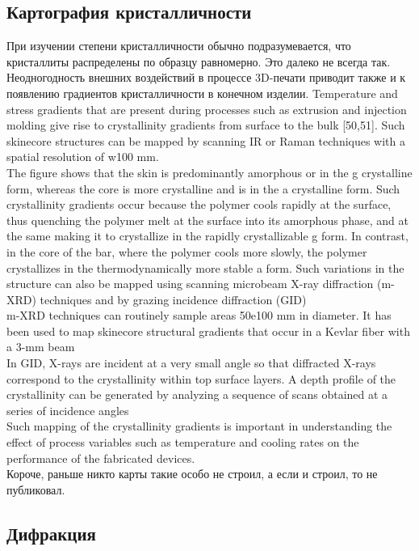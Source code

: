 \subsection{Картография кристалличности}
При изучении степени кристалличности обычно подразумевается, что кристаллиты распределены по образцу равномерно. Это далеко не всегда так. Неодногодность внешних воздействий в процессе 3D-печати приводит также и к появлению градиентов кристалличности в конечном изделии. 
 Temperature
and stress gradients that are present during processes such as extrusion and injection
molding give rise to crystallinity gradients from surface to the bulk [50,51]. Such
skinecore structures can be mapped by scanning IR or Raman techniques with a
spatial resolution of w100 mm.\\
The figure shows that the skin is predominantly amorphous or in the g crystalline
form, whereas the core is more crystalline and is in the a crystalline form. Such crystallinity
gradients occur because the polymer cools rapidly at the surface, thus quenching
the polymer melt at the surface into its amorphous phase, and at the same making it
to crystallize in the rapidly crystallizable g form. In contrast, in the core of the bar,
where the polymer cools more slowly, the polymer crystallizes in the thermodynamically
more stable a form. Such variations in the structure can also be mapped using
scanning microbeam X-ray diffraction (m-XRD) techniques and by grazing incidence
diffraction (GID)\\
m-XRD techniques can routinely sample areas 50e100 mm
in diameter. It has been used to map skinecore structural gradients that occur in a
Kevlar fiber with a 3-mm beam
\\
In GID, X-rays are incident at a very small angle
so that diffracted X-rays correspond to the crystallinity within top surface layers. A
depth profile of the crystallinity can be generated by analyzing a sequence of scans
obtained at a series of incidence angles\\
Such mapping of the crystallinity gradients
is important in understanding the effect of process variables such as temperature
and cooling rates on the performance of the fabricated devices.\\
Короче, раньше никто карты такие особо не строил, а если и строил, то не публиковал.
\subsection{Дифракция}

